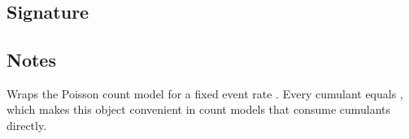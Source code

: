 \documentclass[letterpaper,10pt,english]{sphinxmanual}
\begin{document}
\section{}
\label{\detokenize{object_api_reference:poisson}}

\subsection{Signature}
\label{\detokenize{object_api_reference:id7}}
\begin{sphinxVerbatim}[commandchars=\\\{\}]

\end{sphinxVerbatim}


\subsection{Notes}
\label{\detokenize{object_api_reference:id8}}
\sphinxAtStartPar
Wraps the Poisson count model for a fixed event rate . Every cumulant equals , which makes this object convenient in count models that consume cumulants directly.
\end{document}
